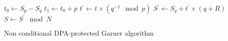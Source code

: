 			\begin{algorithm}[h]
				$t_0 \leftarrow S_p- S_q$\;
				$t_1 \leftarrow t_0 +p$\;
				$t^{'} \leftarrow t \times (q^{-1} \mod p)$	\;
				$S^{'} \leftarrow S_q + t^{'} \times (q+R)$\;
				$ S \leftarrow S^{'}  \mod  N$\;	
				\caption{Non conditional DPA-protected Garner algorithm}
			\end{algorithm}	






